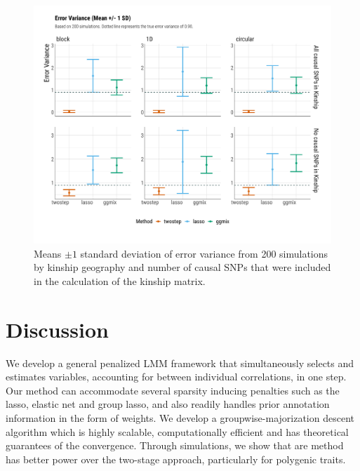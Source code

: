 \documentclass[12pt,letter]{article}\usepackage[]{graphicx}\usepackage[]{color}
\newenvironment{knitrout}{}{} %
\begin{document}
\begin{knitrout}\scriptsize
{}\color{fgcolor}\begin{figure}[H]

{\centering \includegraphics[width=1\linewidth]{figure/plot-errorvar-sim-1} 

}

\caption[Means $\pm 1$ standard deviation of error variance from 200 simulations by kinship geography and number of causal SNPs that were included in the calculation of the kinship matrix]{Means $\pm 1$ standard deviation of error variance from 200 simulations by kinship geography and number of causal SNPs that were included in the calculation of the kinship matrix.}\label{fig:plot-errorvar-sim}
\end{figure}


\end{knitrout}


\section{Discussion}

We develop a general penalized LMM framework that simultaneously selects and estimates variables, accounting for between individual correlations, in one step. Our method can accommodate several sparsity inducing penalties such as the lasso, elastic net and group lasso, and also readily handles prior annotation information in the form of weights. We develop a groupwise-majorization descent algorithm which is highly scalable, computationally efficient and has theoretical guarantees of the convergence. Through simulations, we show that are method has better power over the two-stage approach, particularly for polygenic traits.
\end{document}
